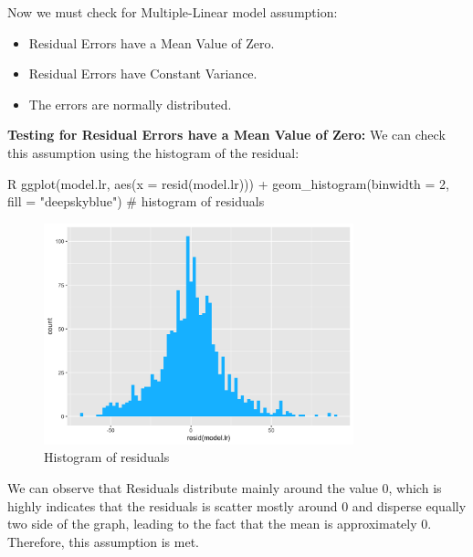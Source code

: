 Now we must check for Multiple-Linear model assumption:
\begin{itemize}
    \item Residual Errors have a Mean Value of Zero.
    \item Residual Errors have Constant Variance.
    \item The errors are normally distributed.
\end{itemize}

\textbf{Testing for Residual Errors have a Mean Value of Zero:} We can check this assumption using the histogram of the residual:
\begin{code}{R}
ggplot(model.lr, aes(x = resid(model.lr))) +
  geom_histogram(binwidth = 2, fill = "deepskyblue") # histogram of residuals
\end{code}
\begin{figure}[H]
    \centering
    \includegraphics[width=0.8\textwidth]{graphics/linear_mean.png}
    \caption{Histogram of residuals}
    \label{fig:31}
\end{figure}

We can observe that Residuals distribute mainly around the value 0, which is highly indicates that the residuals is scatter mostly around 0 and disperse equally two side of the graph, leading to the fact that the mean is approximately 0. Therefore, this assumption is met.

